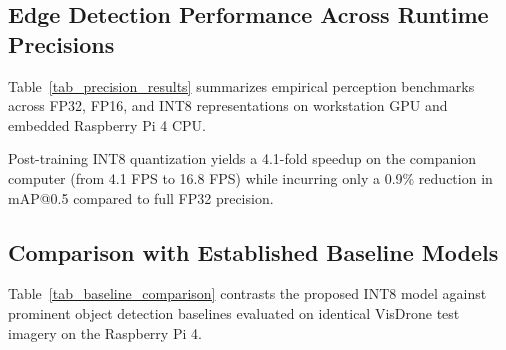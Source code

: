 \documentclass[journal]{IEEEtran}
\begin{document}
\subsection{Edge Detection Performance Across Runtime Precisions}
Table~\ref{tab_precision_results} summarizes empirical perception benchmarks across FP32, FP16, and INT8 representations on workstation GPU and embedded Raspberry Pi 4 CPU.

\begin{table}[!t]
\caption{Empirical Detection Performance Across Runtime Precisions}
\label{tab_precision_results}
\centering
\small
{}
\end{table}

Post-training INT8 quantization yields a 4.1-fold speedup on the companion computer (from 4.1 FPS to 16.8 FPS) while incurring only a 0.9\% reduction in mAP@0.5 compared to full FP32 precision.

\subsection{Comparison with Established Baseline Models}
Table~\ref{tab_baseline_comparison} contrasts the proposed INT8 model against prominent object detection baselines evaluated on identical VisDrone test imagery on the Raspberry Pi 4.
\end{document}
